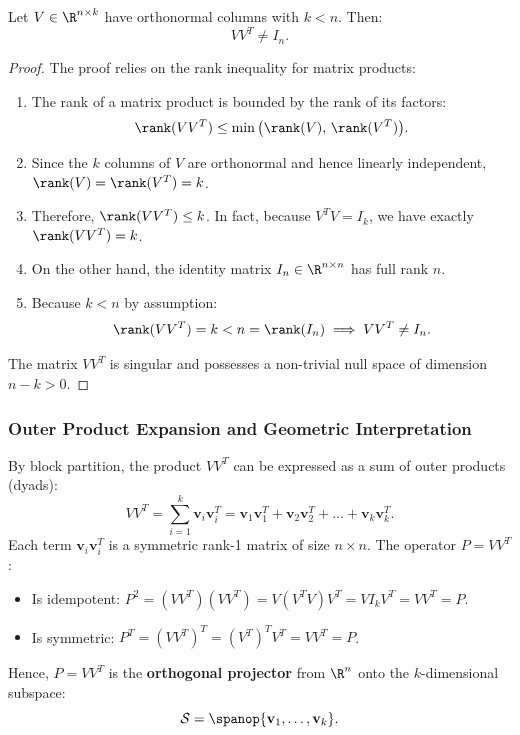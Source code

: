 \begin{theorem}
Let $V \in \R^{n \times k}$ have orthonormal columns with $k < n$. Then:
\begin{equation}
    V V^T \neq I_n.
\end{equation}
\end{theorem}

\begin{proof}
The proof relies on the rank inequality for matrix products:
\begin{enumerate}
    \item The rank of a matrix product is bounded by the rank of its factors:
    \begin{equation}
        \rank(V V^T) \le \min\big(\rank(V), \, \rank(V^T)\big).
    \end{equation}
    \item Since the $k$ columns of $V$ are orthonormal and hence linearly independent, $\rank(V) = \rank(V^T) = k$.
    \item Therefore, $\rank(V V^T) \le k$. In fact, because $V^T V = I_k$, we have exactly $\rank(V V^T) = k$.
    \item On the other hand, the identity matrix $I_n \in \R^{n \times n}$ has full rank $n$.
    \item Because $k < n$ by assumption:
    \begin{equation}
        \rank(V V^T) = k < n = \rank(I_n) \implies V V^T \neq I_n.
    \end{equation}
\end{enumerate}
The matrix $V V^T$ is singular and possesses a non-trivial null space of dimension $n - k > 0$.
\end{proof}

\subsubsection{Outer Product Expansion and Geometric Interpretation}
By block partition, the product $V V^T$ can be expressed as a sum of outer products (dyads):
\begin{equation}
    V V^T = \sum_{i=1}^k \mathbf{v}_i \mathbf{v}_i^T = \mathbf{v}_1 \mathbf{v}_1^T + \mathbf{v}_2 \mathbf{v}_2^T + \dots + \mathbf{v}_k \mathbf{v}_k^T.
\end{equation}
Each term $\mathbf{v}_i \mathbf{v}_i^T$ is a symmetric rank-1 matrix of size $n \times n$. The operator $P = V V^T$:
\begin{itemize}
    \item Is idempotent: $P^2 = (V V^T)(V V^T) = V (V^T V) V^T = V I_k V^T = V V^T = P$.
    \item Is symmetric: $P^T = (V V^T)^T = (V^T)^T V^T = V V^T = P$.
\end{itemize}
Hence, $P = V V^T$ is the \textbf{orthogonal projector} from $\R^n$ onto the $k$-dimensional subspace:
\begin{equation}
    \mathcal{S} = \spanop\{\mathbf{v}_1, \dots, \mathbf{v}_k\}.
\end{equation}

